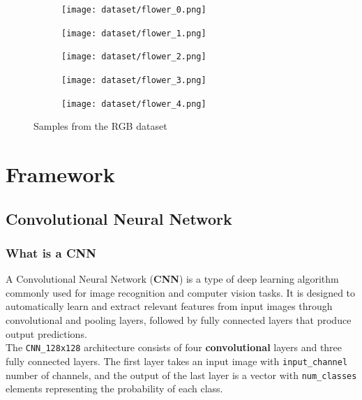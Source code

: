 \documentclass{report}
\begin{document}
\begin{figure}[h!]
  
  \begin{subfigure}[t]{0.24\textwidth}
    \centering
    \texttt{[image: dataset/flower\_0.png]}
    \label{fig:dataset-sub1}
  \end{subfigure}
  \hspace{-0.5cm}
  \begin{subfigure}[t]{0.24\textwidth}
    \centering
    \texttt{[image: dataset/flower\_1.png]}
    \label{fig:dataset-sub1}
  \end{subfigure}
  \hspace{-0.5cm}
  \begin{subfigure}[t]{0.24\textwidth}
    \centering
    \texttt{[image: dataset/flower\_2.png]}
    \label{fig:dataset-sub1}
  \end{subfigure}
  \hspace{-0.5cm}
  \begin{subfigure}[t]{0.24\textwidth}
    \centering
    \texttt{[image: dataset/flower\_3.png]}
    \label{fig:dataset-sub1}
  \end{subfigure}
  \hspace{-0.5cm}
  \begin{subfigure}[t]{0.24\textwidth}
    \centering
    \texttt{[image: dataset/flower\_4.png]}
    \label{fig:dataset-sub1}
  \end{subfigure}
  \hspace{-0.5cm}

  \caption{Samples from the RGB dataset}
  \label{fig:dataset}
\end{figure}


\chapter{Framework}
\section{Convolutional Neural Network}
\subsection{What is a CNN}
A Convolutional Neural Network (\textbf{CNN}) is a type of deep learning algorithm commonly used for image recognition and computer vision tasks. It is designed to automatically learn and extract relevant features from input images through convolutional and pooling layers, followed by fully connected layers that produce output predictions. \\
The \texttt{CNN\_128x128} architecture consists of four \textbf{convolutional} layers and three fully connected layers. The first layer takes an input image with \texttt{input\_channel} number of channels, and the output of the last layer is a vector with \texttt{num\_classes} elements representing the probability of each class.
\end{document}
